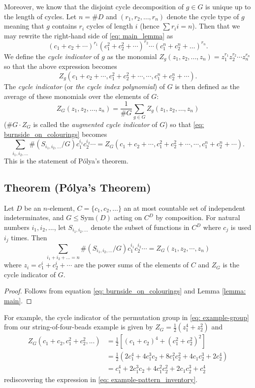 \documentclass[a4paper,11pt]{article}
\numberwithin{equation}{section}
\begin{document}
    Moreover, we know that the disjoint cycle decomposition of $g\in G$ is unique up to the length of cycles. Let $n=\#D$ and $(r_{1},r_{2}, \dots,r_{n})$ denote the cycle type of $g$ meaning that $g$ contains $r_{i}$ cycles of length $i$ (hence $\sum r_{i}i = n$). Then that we may rewrite the right-hand side of \eqref{eq: main_lemma} as \[(c_{1}+c_{2}+\cdots)^{r_{1}}(c_{1}^2+c_{2}^2+\cdots)^{r_{2}}\cdots(c_{1}^{n}+c_{2}^{n}+\dots)^{r_{n}}. \]We define the \textit{cycle indicator} of $g$ as the monomial $Z_g(z_1, z_2,...,z_n) = z_1^{r_1} z_{2}^{r_2} \cdots z_n^{r_n}$ so that the above expression becomes \[ Z_{g}(c_1 + c_2 +  \cdots, c_1^2 + c_2^2 + \cdots, \cdots, c_1^n +c_2^n + \cdots) .\]  The \textit{cycle indicator} (or \textit{the cycle index polynomial}) of $G$ is then defined as the average of these monomials over the elements of $G$: $$Z_{G}(z_{1},z_{2},\dots,z_{n}) = \frac{1}{\# G} \sum_{g \in G} Z_{g}(z_{1},z_{2},\dots,z_{n})$$($\#G \cdot Z_G$ is called the \textit{augmented cycle indicator} of $G$) so that \eqref{eq: burnside_on_colourings} becomes \[\sum_{i_{1}, i_{2}, \dots} \#(S_{i_{1}, i_{2}, \dots} / G)  c_1^{i_1}c_{2}^{i_2}\cdots = Z_G(c_1 + c_2 +  \cdots, c_1^2 + c_2^2 + \cdots, \cdots, c_1^n +c_2^n + \cdots) .\] This is the statement of Pólya's theorem. 

    \subsection{Theorem \textnormal{(Pólya's Theorem)}} \label{thm: Polya} Let $D$ be an $n$-element, $C=\{c_1, c_2, \dots\}$ an at most countable set of independent indeterminates, and $G \leq \text{Sym}(D)$ acting on $C^D$ by composition. For natural numbers $i_{1}, i_{2}, ...$, let $S_{i_1, i_2, ...}$ denote the subset of functions in $C^D$ where $c_j$ is used $i_j$ times. Then \begin{equation}
    \sum_{i_{1}+ i_{2}+\dots =n } \# (S_{i_{1}, i_{2}, \dots}/G)  c_{1}^{i_{1}}c_{2}^{i_{2}} \cdots  =  Z_{G}(z_{1}, z_{2}, \cdots, z_{n}) \label{eq: Polya_s_theorem} 
    \end{equation}
    where $z_{i} = c_1^i+c_2^i + \cdots$ are the power sums of the elements of $C$ and $Z_G$ is the cycle indicator of $G$. 

    \begin{proof}
    Follows from equation \eqref{eq: burnside_on_colourings} and Lemma \ref{lemma: main}.
    \end{proof}
 
    For example, the cycle indicator of the permutation group  in \eqref{eq: example-group} from our string-of-four-beads example is given by \( Z_{G} = \frac{1}{2} (z_1^4 + z_2^2 ) \) and 
    \begin{align*}
        Z_G(c_1 + c_2, c_1^2 + c_2^2, ...) &= \frac{1}{2} \left [ (c_1+c_2)^{4} + (c_1^2 + c_2^2)^2 \right] \\ 
        &= \frac{1}{2} (2c_1^4  + 4c_1^3c_2 + 8c_1^2c_2^2 + 4c_1c_2^3 + 2c_2^4 ) \\
        &= c_1^4 + 2c_1^3c_2 + 4 c_1^2c_2^2 + 2c_1c_2^3 + c_2^4
    \end{align*}rediscovering the expression in \eqref{eq: example-pattern_inventory}. \medskip
\end{document}
